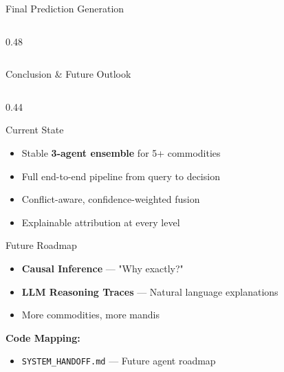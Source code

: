 \documentclass[aspectratio=169]{beamer}
\begin{document}
\begin{frame}{Final Prediction Generation}
\begin{columns}[T]
\begin{column}{0.48\textwidth}
  \end{column}
\end{columns}
\end{frame}

\begin{frame}{Conclusion \& Future Outlook}
\begin{columns}[T]
  \begin{column}{0.44\textwidth}
    \begin{block}{Current State}
      \begin{itemize}\setlength\itemsep{4pt}
        \item Stable \textbf{3-agent ensemble} for 5+ commodities
        \item Full end-to-end pipeline from query to decision
        \item Conflict-aware, confidence-weighted fusion
        \item Explainable attribution at every level
      \end{itemize}
    \end{block}
    \vspace{0.2cm}
    \begin{exampleblock}{Future Roadmap}
      \begin{itemize}\setlength\itemsep{3pt}
        \item \textbf{Causal Inference} — "Why exactly?"
        \item \textbf{LLM Reasoning Traces} — Natural language explanations
        \item More commodities, more mandis
      \end{itemize}
    \end{exampleblock}
    \vspace{0.15cm}
    \textbf{Code Mapping:}
    \begin{itemize}
      \item \texttt{SYSTEM\_HANDOFF.md} — Future agent roadmap
    \end{itemize}

\end{column}
\end{columns}
\end{frame}
\end{document}

